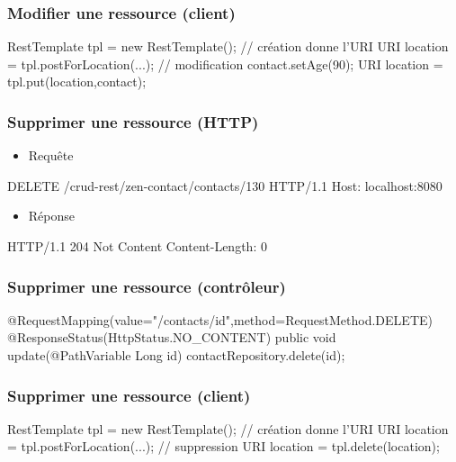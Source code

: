 \begin{frame}[fragile]
 \frametitle{Modifier une ressource (client)}
 
 \begin{javacode}
RestTemplate tpl = new RestTemplate();
// cr\'eation donne l'URI
URI location = tpl.postForLocation(...);
// modification
contact.setAge(90);
URI location = tpl.put(location,contact);
 \end{javacode}  

\end{frame}

\begin{frame}[fragile]
 \frametitle{Supprimer une ressource (HTTP)}
 
 \begin{itemize}
  \item Requête
 \end{itemize} 
 
 \begin{textcode}
DELETE /crud-rest/zen-contact/contacts/130 HTTP/1.1
Host: localhost:8080
 \end{textcode}
 
  \begin{itemize}
  \item Réponse
 \end{itemize} 
 
 \begin{textcode}
HTTP/1.1 204 Not Content
Content-Length: 0
 \end{textcode}

\end{frame}

\begin{frame}[fragile]
 \frametitle{Supprimer une ressource (contrôleur)}
 
 \begin{javacode}
@RequestMapping(value="/contacts/{id}",method=RequestMethod.DELETE)
@ResponseStatus(HttpStatus.NO_CONTENT)
public void update(@PathVariable Long id) {
  contactRepository.delete(id);
}
 \end{javacode}  

\end{frame}

\begin{frame}[fragile]
 \frametitle{Supprimer une ressource (client)}
 
 \begin{javacode}
RestTemplate tpl = new RestTemplate();
// cr\'eation donne l'URI
URI location = tpl.postForLocation(...);
// suppression
URI location = tpl.delete(location);
 \end{javacode}  

\end{frame}

